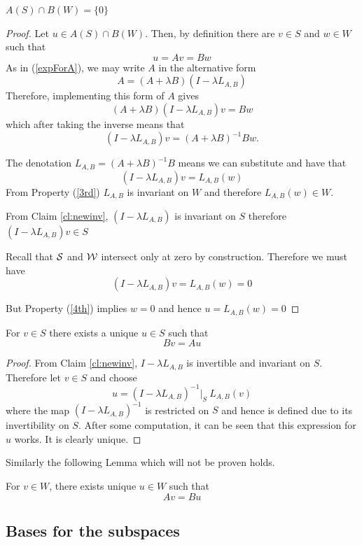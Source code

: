 \begin{lemma}\label{copying}
    $A(S)\cap B(W)=\{0\}$
\end{lemma}
\begin{proof}
    Let $u\in A(S)\cap B(W)$. Then, by definition there are $v\in S$ and $w\in W$ such that $$u=Av=Bw$$
    As in (\ref{expForA}), we may write $A$ in the alternative form $$A=(A+\lambda B)(I-\lambda L_{A,B})$$Therefore, implementing this form of $A$ gives $$(A+\lambda B)(I-\lambda L_{A,B})v=Bw$$which after taking the inverse means that $$(I-\lambda L_{A,B})v=(A+\lambda B)^{-1}Bw.$$

    The denotation $L_{A,B}=(A+\lambda B)^{-1}B$ means we can substitute and have that $$(I-\lambda L_{A,B})v=L_{A,B}(w)$$
    From Property (\ref{3rd}) $L_{A,B}$ is invariant on $W$ and therefore $L_{A,B}(w)\in W \label{x}$.

    From Claim \ref{cl:newinv}, $(I-\lambda L_{A,B})$ is invariant on $S$ therefore $(I-\lambda L_{A,B})v\in S \label{y}$

    Recall that \(\mathcal{S}\) and \(\mathcal{W}\) intersect only at zero by construction. Therefore we must have $$(I-\lambda L_{A,B})v=L_{A,B}(w)=0 $$

    But Property (\ref{4th}) implies $w=0$ and hence $u=L_{A,B}(w)=0$
\end{proof}

\begin{lemma}\label{charA}
    For $v\in S$ there exists a unique $u\in S$ such that $$Bv=Au$$
\end{lemma}

\begin{proof}
    From Claim \ref{cl:newinv}, $I-\lambda L_{A,B}$ is invertible and invariant on $S$. Therefore let $v\in S$ and choose $$u=(I-\lambda L_{A,B})^{-1}|_S\ L_{A,B} (v)$$where the map $(I-\lambda L_{A,B})^{-1}$ is restricted on $S$ and hence is defined due to its invertibility on $S$. After some computation, it can be seen that this expression for $u$ works. It is clearly unique.
\end{proof}


Similarly the following Lemma which will not be proven holds.
\begin{lemma}\label{charB}
    For $v\in W$, there exists unique $u\in W$ such that $$Av=Bu$$
\end{lemma}


\subsection{Bases for the subspaces}\label{sectionbasis}
